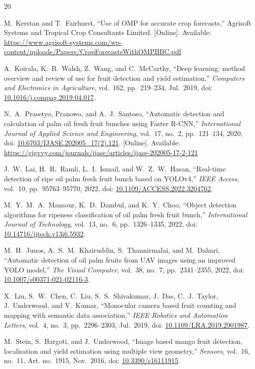 \documentclass[conference]{IEEEtran}
\begin{document}
\begin{thebibliography}{20}

M.~Kerstan and T.~Fairhurst,
``Use of OMP for accurate crop forecasts,''
Agrisoft Systems and Tropical Crop Consultants Limited. [Online]. Available:
\url{https://www.agrisoft-systems.com/wp-content/uploads/Papers/CropForecastsWithOMPBBC.pdf}

A.~Koirala, K.~B.~Walsh, Z.~Wang, and C.~McCarthy,
``Deep learning: method overview and review of use for fruit detection and
yield estimation,''
\textit{Computers and Electronics in Agriculture}, vol.~162, pp.~219--234,
Jul.~2019, doi: \url{10.1016/j.compag.2019.04.017}.

N.~A.~Prasetyo, Pranowo, and A.~J.~Santoso,
``Automatic detection and calculation of palm oil fresh fruit bunches using
Faster R-CNN,''
\textit{International Journal of Applied Science and Engineering}, vol.~17,
no.~2, pp.~121--134, 2020, doi:
\url{10.6703/IJASE.202005_17(2).121}. [Online]. Available:
\url{https://gigvvy.com/journals/ijase/articles/ijase-202005-17-2-121}

J.~W.~Lai, H.~R.~Ramli, L.~I.~Ismail, and W.~Z.~W.~Hasan,
``Real-time detection of ripe oil palm fresh fruit bunch based on YOLOv4,''
\textit{IEEE Access}, vol.~10, pp.~95763--95770, 2022,
doi: \url{10.1109/ACCESS.2022.3204762}.

M.~Y.~M.~A.~Mansour, K.~D.~Dambul, and K.~Y.~Choo,
``Object detection algorithms for ripeness classification of oil palm fresh
fruit bunch,''
\textit{International Journal of Technology}, vol.~13, no.~6,
pp.~1326--1335, 2022, doi: \url{10.14716/ijtech.v13i6.5932}.

M.~H.~Junos, A.~S.~M.~Khairuddin, S.~Thannirmalai, and M.~Dahari,
``Automatic detection of oil palm fruits from UAV images using an improved
YOLO model,''
\textit{The Visual Computer}, vol.~38, no.~7, pp.~2341--2355, 2022,
doi: \url{10.1007/s00371-021-02116-3}.

X.~Liu, S.~W.~Chen, C.~Liu, S.~S.~Shivakumar, J.~Das, C.~J.~Taylor,
J.~Underwood, and V.~Kumar,
``Monocular camera based fruit counting and mapping with semantic data
association,''
\textit{IEEE Robotics and Automation Letters}, vol.~4, no.~3, pp.~2296--2303,
Jul.~2019, doi: \url{10.1109/LRA.2019.2901987}.

M.~Stein, S.~Bargoti, and J.~Underwood,
``Image based mango fruit detection, localisation and yield estimation using
multiple view geometry,''
\textit{Sensors}, vol.~16, no.~11, Art. no.~1915, Nov.~2016,
doi: \url{10.3390/s16111915}.


\end{thebibliography}
\end{document}

